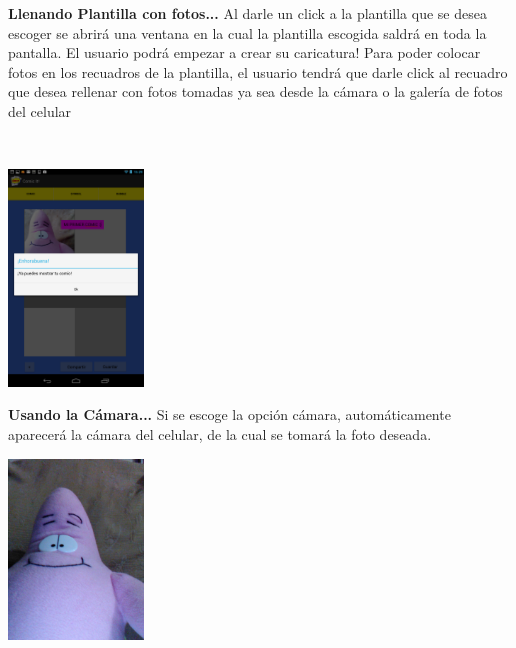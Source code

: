 \documentclass[12pt]{report}
\begin{document}
\begingroup
		\large{
			\textbf{
				Llenando Plantilla con fotos...
				\newline
				\newline
			}
		}
	\endgroup
Al darle un click a la plantilla que se desea escoger se abrirá una ventana en la cual la plantilla escogida saldrá en toda la pantalla. El usuario podrá empezar a crear su caricatura!
Para poder colocar fotos en los recuadros de la plantilla, el usuario tendrá que darle click al recuadro que desea rellenar con fotos tomadas ya sea desde la cámara o la galería de fotos del celular

\
	\begin{center}
		\begingroup
			\includegraphics[width=0.27\textwidth]{imagenes_usuario/camara.png}

		\endgroup
	\end{center}


\begingroup
		\large{
			\textbf{
				Usando la Cámara...
				\newline
				\newline
			}
		}
	\endgroup
Si se escoge la opción cámara, automáticamente aparecerá la cámara del celular, de la cual se tomará la foto deseada.
\newline
	\begin{center}
		\begingroup
			\includegraphics[width=0.27\textwidth]{imagenes_usuario/foto.jpg}
		\endgroup
	\end{center}
\end{document}
